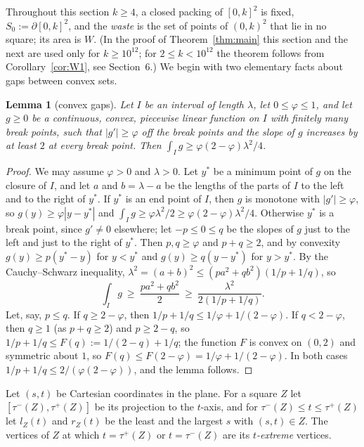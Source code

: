 \documentclass[11pt]{amsart}
\newtheorem{lemma}[theorem]{Lemma}
\theoremstyle{definition}
\theoremstyle{remark}
\begin{document}
Throughout this section $k\ge4$, a closed packing of $[0,k]^2$ is fixed, $S_0:=\partial[0,k]^2$, and the \emph{waste} is the set of
points of $(0,k)^2$ that lie in no square; its area is $W$. (In the proof of Theorem~\ref{thm:main} this section and the next are used only for
$k\ge10^{12}$; for $2\le k<10^{12}$ the theorem follows from Corollary~\ref{cor:W1}, see Section~6.) We begin with two elementary facts about gaps between convex sets.

\begin{lemma}[convex gaps]\label{lem:cg}
Let $I$ be an interval of length $\lambda$, let $0\le\varphi\le1$, and let $g\ge0$ be a continuous, convex, piecewise linear
function on $I$ with finitely many break points, such that $|g'|\ge\varphi$ off the break points and the slope of $g$
increases by at least $2$ at every break point. Then $\int_Ig\ge\varphi(2-\varphi)\lambda^2/4$.
\end{lemma}

\begin{proof}
We may assume $\varphi>0$ and $\lambda>0$. Let $y^*$ be a minimum point of $g$ on the closure of $I$, and let $a$ and
$b=\lambda-a$ be the lengths of the parts of $I$ to the left and to the right of $y^*$. If $y^*$ is an end point of $I$, then
$g$ is monotone with $|g'|\ge\varphi$, so $g(y)\ge\varphi|y-y^*|$ and $\int_Ig\ge\varphi\lambda^2/2\ge\varphi(2-\varphi)\lambda^2/4$.
Otherwise $y^*$ is a break point, since $g'\ne0$ elsewhere; let $-p\le0\le q$ be the slopes of $g$ just to the left and just
to the right of $y^*$. Then $p,q\ge\varphi$ and $p+q\ge2$, and by convexity $g(y)\ge p(y^*-y)$ for $y<y^*$ and
$g(y)\ge q(y-y^*)$ for $y>y^*$. By the Cauchy--Schwarz inequality, $\lambda^2=(a+b)^2\le(pa^2+qb^2)(1/p+1/q)$, so
\[
\int_Ig\ \ge\ \frac{pa^2+qb^2}2\ \ge\ \frac{\lambda^2}{2(1/p+1/q)} .
\]
Let, say, $p\le q$. If $q\ge2-\varphi$, then $1/p+1/q\le1/\varphi+1/(2-\varphi)$. If $q<2-\varphi$, then $q\ge1$ (as
$p+q\ge2$) and $p\ge2-q$, so $1/p+1/q\le F(q):=1/(2-q)+1/q$; the function $F$ is convex on $(0,2)$ and symmetric about $1$,
so $F(q)\le F(2-\varphi)=1/\varphi+1/(2-\varphi)$. In both cases $1/p+1/q\le2/(\varphi(2-\varphi))$, and the lemma follows.
\end{proof}

Let $(s,t)$ be Cartesian coordinates in the plane. For a square $Z$ let $[\tau^-(Z),\tau^+(Z)]$ be its projection to the
$t$-axis, and for $\tau^-(Z)\le t\le\tau^+(Z)$ let $l_Z(t)$ and $r_Z(t)$ be the least and the largest $s$ with $(s,t)\in Z$.
The vertices of $Z$ at which $t=\tau^+(Z)$ or $t=\tau^-(Z)$ are its \emph{$t$-extreme} vertices.
\end{document}
